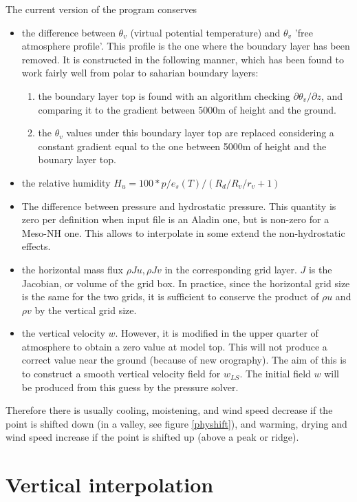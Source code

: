 \clearpage

The current version of the program conserves
\begin{itemize}
\item
the difference between $\theta_v$ (virtual potential temperature)
and $\theta_v$ 'free atmosphere profile'.
This profile is the one where the boundary layer has been removed.
It is constructed in the following
manner, which has been found to work fairly well from polar to saharian
boundary layers:
\begin{enumerate}
\item the boundary layer top is found with an algorithm checking
$\partial \theta_v / \partial z$, and comparing it to
the gradient between 5000m of height and the ground.
\item the $\theta_v$ values under this boundary layer top are replaced
considering a constant gradient equal to the one between 5000m of height
and the bounary layer top.
\end{enumerate}
\item
the relative humidity $H_u=100 * p/e_s(T)/(R_d/R_v/r_v + 1)$
\item
The difference between pressure and hydrostatic pressure.
This quantity is zero per definition when input file is an Aladin one, but
is non-zero for a Meso-NH one. This allows to interpolate in some
extend the non-hydrostatic effects.
\item
the horizontal mass flux $\rho J u, \rho J v$
in the corresponding grid layer. $J$ is the Jacobian, or volume of the grid
box. In practice, since the horizontal grid size is the same for the two
grids, it is sufficient to conserve the product of $\rho u$ and $\rho v$
by the vertical grid size.
\item
the vertical velocity $w$. However, it is modified in the upper quarter
of atmosphere to obtain a zero value at model top.
This will not produce a correct value near the ground (because of new orography).
The aim of this is to construct a smooth vertical velocity field for
$w_{LS}$. The initial field $w$ will be produced from this
guess by the pressure solver.
\end{itemize}

Therefore there is usually cooling, moistening, and wind speed decrease
if the point is shifted down (in a valley, see figure \ref{physhift}),
and warming, drying and wind speed increase if the point is shifted up
(above a peak or ridge).

\section{Vertical interpolation}

